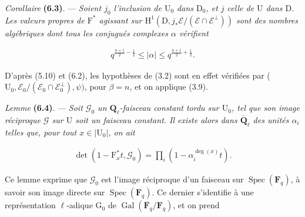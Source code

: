 \documentclass[10pt,leqno]{article}
\begin{document}
\noindent \emph{Corollaire} \textbf{(6.3)}. — {\itshape Soient \(j_{0}\) l’inclusion de \(\mathrm{U}_{0}\) dans \(\mathrm{D}_{0}\), et \(j\) celle de \(\mathrm{U}\) dans \(\mathrm{D}\). Les valeurs propres de \(\mathrm{F}^{*}\) agissant sur \(\mathrm{H}^{1}(\mathrm{D},j_{*}\mathcal{E} /(\mathcal{E} \cap \mathcal{E} ^{\perp }))\) sont des nombres algébriques dont tous les conjugués complexes \(\alpha \) vérifient}\par

\begin{equation*}\begin{gathered}q^{\frac{n+1}{2}- \frac{1}{2}} \leq  |\alpha | \leq  q^{\frac{n+1}{2}+\frac{1}{2}}.\end{gathered}\end{equation*}

\noindent D’après (5.10) et (6.2), les hypothèses de (3.2) sont en effet vérifiées par (\(\mathrm{U}_{0},\mathcal{E} _{0}/(\mathcal{E} _{0}\cap \mathcal{E} _{0}^{\perp }),\psi )\), pour \(\beta =n\), et on applique (3.9).\par

\noindent \emph{Lemme} \textbf{(6.4)}. — {\itshape Soit \(\mathcal{G} _{0}\) un \(\mathbf{Q}_{\ell }\)-faisceau constant tordu sur \(\mathrm{U}_{0}\), tel que son image réciproque \(\mathcal{G} \) sur \(\mathrm{U}\) soit un faisceau constant. Il existe alors dans \(\overline{\mathbf{Q}}_{\ell }\) des unités \(\alpha _{i}\) telles que, pour tout \(x\in |\mathrm{U}_{0}|\), on ait}\par

\begin{equation*}\begin{gathered}\operatorname{det}(1- \mathrm{F}_{x}^{*}t,\mathcal{G} _{0})=\prod _{i}(1- \alpha _{i}^{\operatorname{deg}(x)}t).\end{gathered}\end{equation*}

\clearpage

\label{physical-25}\par\smallskip

\noindent Ce lemme exprime que \(\mathcal{G} _{0}\) est l’image réciproque d’un faisceau sur \(\operatorname{Spec}(\mathbf{F}_{q})\), à savoir son image directe sur \(\operatorname{Spec}(\mathbf{F}_{q})\). Ce dernier s’identifie à une représentation \(\ell \)-adique \(\mathrm{G}_{0}\) de \(\operatorname{Gal}(\overline{\mathbf{F}}_{q}/\mathbf{F}_{q})\), et on prend\par
\end{document}
